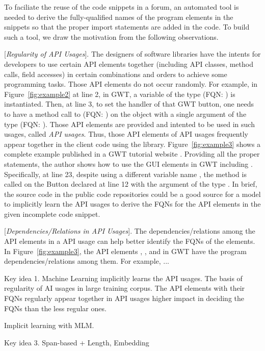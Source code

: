 To faciliate the reuse of the code snippets in a forum, an automated
tool is needed to derive the fully-qualified names of the program
elements in the snippets so that the proper import statements are
added in the code. To build such a tool, we draw the motivation from
the following observations.

\vspace{2pt}
 [{\em Regularity of API Usages}]. The
designers of software libraries have the intents for developers to use
certain API elements together (including API classes, method calls,
field accesses) in certain combinations and orders to achieve some
programming tasks. Those API elements do not occur randomly. For
example, in Figure~\ref{fig:example2} at line 2, in GWT, a variable of
the type  (FQN:
) is instantiated. Then, at
line 3, to set the handler of that GWT button, one needs to have a
method call to  (FQN:
) on
the  object with a single argument of the type
 (FQN:
).
Those API elements are provided and intented to be used in such
usages, called {\em API usages}. Thus, those API elements of API
usages frequently appear together in the client code using the
library. Figure~\ref{fig:example3} shows a complete example published
in a GWT tutorial website . Providing all the
proper  statements, the author shows how to use the GUI
elements in GWT including . Specifically, at line 23,
despite using a different variable name , the
method  is called on the Button declared at line
12 with the argument of the type . In brief, the
source code in the public code repositories could be a good source for
a model to implicitly learn the API usages to derive the FQNs for the
API elements in the given incomplete code snippet.

\vspace{2pt}
 [{\em Dependencies/Relations in API
    Usages}]. The dependencies/relations among the API elements in a
API usage can help better identify the FQNs of the elements.  In
Figure~\ref{fig:example3}, the API elements ,
, and  in GWT have the
program dependencies/relations among them. For example, ...






Key idea 1. Machine Learning implicitly learns the API usages. The
basis of regularity of AI usages in large training corpus.  The API
elements with their FQNs regularly appear together in API usages
higher impact in deciding the FQNs than the less regular ones.

Implicit learning with MLM.


Key idea 3. Span-based + Length, Embedding

